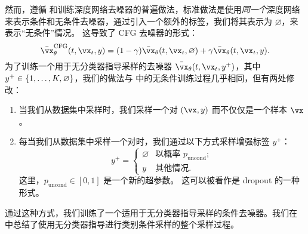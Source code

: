 \documentclass[../../book-main_zh.tex]{subfiles}
\begin{document}

然而，遵循 \textcite{Ho2022-ry} 和训练深度网络去噪器的普遍做法，标准做法是使用\textit{同一个}深度网络来表示条件和无条件去噪器，通过引入一个额外的标签，我们将其表示为 $\varnothing$，来表示“无条件”情况。
这导致了 CFG 去噪器的形式：
\begin{equation}\label{eq:conditional-denoising-mmse-denoiser-paired-data-approx-cfg}
  \bar{\vx}_{\theta}^{\mathrm{CFG}}(t, \vx_t, y)
  =
  (1 - \gamma) \bar{\vx}_{\theta}(t, \vx_t, \varnothing)
  +
  \gamma \bar{\vx}_{\theta}(t, \vx_t, y).
\end{equation}
为了训练一个用于无分类器指导采样的去噪器 $\bar{\vx}_{\theta}(t, \vx_t, y^+)$，其中 $y^+ \in \set{1, \dots, K, \varnothing}$，我们的做法与  中的无条件训练过程几乎相同，但有两处修改：
\begin{enumerate}
  \item 当我们从数据集中采样时，我们采样一个对 $(\vx, y)$ 而不仅仅是一个样本 $\vx$。
  \item 每当我们从数据集中采样一个对时，我们通过以下方式采样增强标签 $y^+$：
    \begin{equation}
      y^+ = \begin{cases}
        \varnothing & \text{以概率 } p_{\mathrm{uncond}}; \\
        y & \text{其他情况}.
      \end{cases}
    \end{equation}
    这里，$p_{\mathrm{uncond}} \in [0, 1]$ 是一个新的超参数。
    这可以被看作是 dropout \cite{srivastava2014dropout} 的一种形式。
\end{enumerate}
通过这种方式，我们训练了一个适用于无分类器指导采样的条件去噪器。我们在  中总结了使用无分类器指导进行类别条件采样的整个采样过程。
\end{document}
